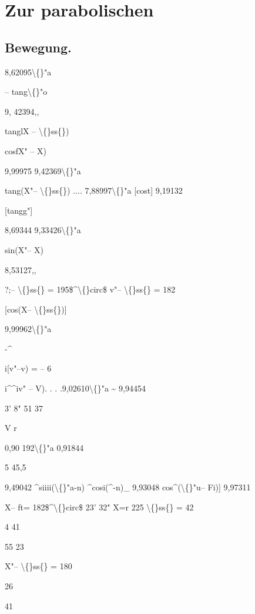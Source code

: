 \documentclass[10pt,a4paper]{article}
\begin{document}
\newpage
\section*{Zur parabolischen}

\subsection*{Bewegung.}

8,62095\textbackslash\{\}"a

-- tang\textbackslash\{\}"o

9, 42394,,

tanglX -- \textbackslash\{\}ss\{\})

cosfX" -- X)

9,99975
9,42369\textbackslash\{\}"a

tang(X"-- \textbackslash\{\}ss\{\}) .... 7,88997\textbackslash\{\}"a
[cost]
9,19132

[tangg"]

8,69344
9,33426\textbackslash\{\}"a

sin(X"-- X)

8,53127,,

?;-- \textbackslash\{\}ss\{\} = 195\$\textasciicircum{}\textbackslash\{\}circ\$
v"-- \textbackslash\{\}ss\{\} = 182

[cos(X-- \textbackslash\{\}ss\{\})]

9,99962\textbackslash\{\}"a

-\textasciicircum{}

i[v"--v) = -- 6

i\textasciicircum{}\textasciicircum{}iv" -- V). . . .9,02610\textbackslash\{\}"a
\textasciitilde{}
9,94454

3' 8"
51 37

V r

0,90 192\textbackslash\{\}"a
0,91844

5 45,5

9,49042
\textasciicircum{}siiii(\textbackslash\{\}"a-n)
\textasciicircum{}cosi(\textasciicircum{}-n)\_ 9,93048
cos\textasciicircum{}(\textbackslash\{\}"u-- Fi)]
9,97311

X-- ft= 182\$\textasciicircum{}\textbackslash\{\}circ\$ 23' 32"
X=r 225
\textbackslash\{\}ss\{\} =
42

4
41

55
23

X"-- \textbackslash\{\}ss\{\} = 180

26

41
\end{document}
